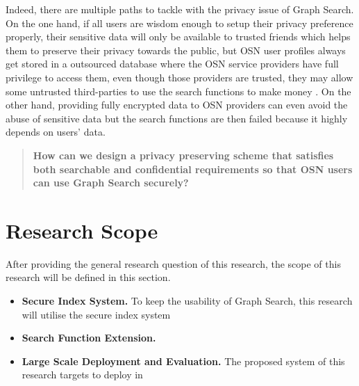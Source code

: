 Indeed, there are multiple paths to tackle with the privacy issue of Graph Search. On the one hand, if all users are wisdom enough to setup their privacy preference properly, their sensitive data will only be available to trusted friends which helps them to preserve their privacy towards the public, but OSN user profiles always get stored in a outsourced database where the OSN service providers have full privilege to access them, even though those providers are trusted, they may allow some untrusted third-parties to use the search functions to make money \cite{nytime2012facebook, time2013twitter}. On the other hand, providing fully encrypted data to OSN providers can even avoid the abuse of sensitive data but the search functions are then failed because it highly depends on users' data. 



\begin{quotation}
{\bf How can we design a privacy preserving scheme that satisfies both searchable and confidential requirements so that OSN users can use Graph Search securely?}
\end{quotation}

\section{Research Scope}
After providing the general research question of this research, the scope of this research will be defined in this section. 

\begin{itemize}
\item{\bf Secure Index System.} To keep the usability of Graph Search, this research will utilise the secure index system 
\item{\bf Search Function Extension.}
\item {\bf Large Scale Deployment and Evaluation.} The proposed system of this research targets to deploy in 
\end{itemize}
















